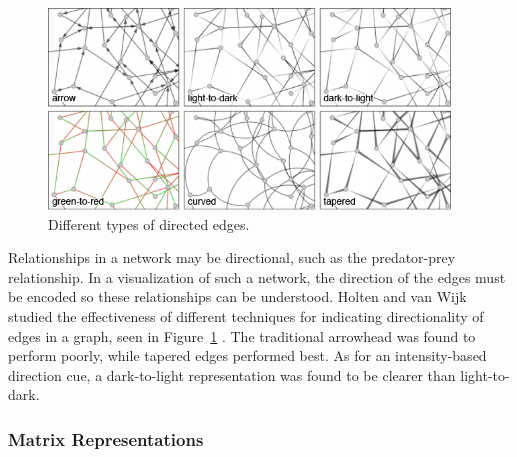 \begin{figure}[h]
	\centering
	\includegraphics[width=0.95\textwidth]{figures/png/directedEdges.png}
	\caption[Different types of directed edges]{Different types of directed edges.}
	\label{fig:directedEdges}
\end{figure}

Relationships in a network may be directional, such as the predator-prey relationship.  In a visualization of such a network, the direction of the edges must be encoded so these relationships can be understood.  Holten and van Wijk studied the effectiveness of different techniques for indicating directionality of edges in a graph, seen in Figure~\ref{fig:directedEdges} \citeyearpar{holten2009}.  The traditional arrowhead was found to perform poorly, while tapered edges performed best.  As for an intensity-based direction cue, a dark-to-light representation was found to be clearer than light-to-dark.

\subsubsection{Matrix Representations}

